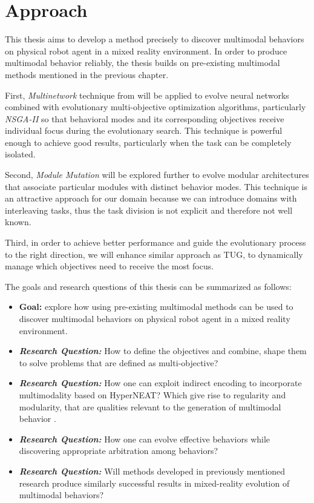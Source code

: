 \documentclass[format=acmsmall, review=false, screen=true]{acmart}
\begin{document}
\section{Approach}

This thesis aims to develop a method precisely to discover multimodal behaviors on physical robot agent in a mixed reality environment. In order to produce multimodal behavior reliably, the thesis builds on pre-existing multimodal methods mentioned in the previous chapter.

First, \emph{Multinetwork} technique from \cite{schrum2014evolving} will be applied to evolve neural networks combined with evolutionary multi-objective optimization algorithms, particularly \emph{NSGA-II} so that behavioral modes and its corresponding objectives receive individual focus during the evolutionary search. This technique is powerful enough to achieve good results, particularly when the task can be completely isolated.

Second, \emph{Module Mutation} will be explored further to evolve modular architectures that associate particular modules with distinct behavior modes. This technique is an attractive approach for our domain because we can introduce domains with interleaving tasks, thus the task division is not explicit and therefore not well known.

Third, in order to achieve better performance and guide the evolutionary process to the right direction, we will enhance similar approach as TUG, to dynamically manage which objectives need to receive the most focus.

The goals and research questions of this thesis can be summarized as follows:

\begin{itemize}
  \item \textbf{Goal:} explore how using pre-existing multimodal methods can be used to discover multimodal behaviors on physical robot agent in a mixed reality environment.
  \item \textbf{\textit{Research Question:}} How to define the objectives and combine, shape them to solve problems that are defined as multi-objective?
  \item \textbf{\textit{Research Question:}} How one can exploit indirect encoding to incorporate multimodality based on HyperNEAT? Which give rise to regularity and modularity, that are qualities relevant to the generation of multimodal behavior \cite{huizinga2014evolving}.
  \item \textbf{\textit{Research Question:}} How one can evolve effective behaviors while discovering appropriate arbitration among behaviors?
  \item \textbf{\textit{Research Question:}} Will methods developed in previously mentioned research produce similarly successful results in mixed-reality evolution of multimodal behaviors?
\end{itemize}
\end{document}

